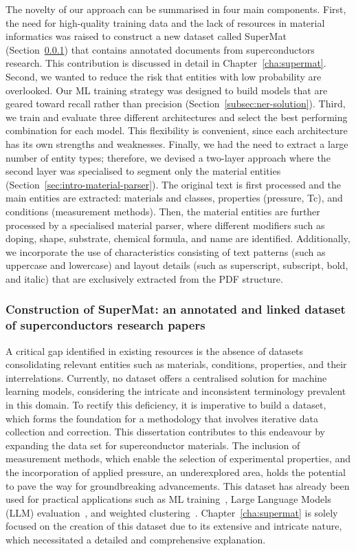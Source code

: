 The novelty of our approach can be summarised in four main components. 
First, the need for high-quality training data and the lack of resources in material informatics was raised to construct a new dataset called SuperMat (Section~\ref{sec:intro-supermat}) that contains annotated documents from superconductors research. This contribution is discussed in detail in Chapter~\ref{cha:supermat}.
Second, we wanted to reduce the risk that entities with low probability are overlooked. Our ML training strategy was designed to build models that are geared toward recall rather than precision (Section~\ref{subsec:ner-solution}).
Third, we train and evaluate three different architectures and select the best performing combination for each model. This flexibility is convenient, since each architecture has its own strengths and weaknesses.  
Finally, we had the need to extract a large number of entity types; therefore, we devised a two-layer approach where the second layer was specialised to segment only the material entities (Section~\ref{sec:intro-material-parser}).  
The original text is first processed and the main entities are extracted: materials and classes, properties (pressure, Tc), and conditions (measurement methods). 
Then, the material entities are further processed by a specialised material parser, where different modifiers such as doping, shape, substrate, chemical formula, and name are identified. 
Additionally, we incorporate the use of characteristics consisting of text patterns (such as uppercase and lowercase) and layout details (such as superscript, subscript, bold, and italic) that are exclusively extracted from the PDF structure.

\subsubsection{Construction of SuperMat: an annotated and linked dataset of superconductors research papers}
\label{sec:intro-supermat}
A critical gap identified in existing resources is the absence of datasets consolidating relevant entities such as materials, conditions, properties, and their interrelations. 
Currently, no dataset offers a centralised solution for machine learning models, considering the intricate and inconsistent terminology prevalent in this domain. 
To rectify this deficiency, it is imperative to build a dataset, which forms the foundation for a methodology that involves iterative data collection and correction. This dissertation contributes to this endeavour by expanding the data set for superconductor materials. 
The inclusion of measurement methods, which enable the selection of experimental properties, and the incorporation of applied pressure, an underexplored area, holds the potential to pave the way for groundbreaking advancements.
This dataset has already been used for practical applications such as ML training~\cite{foppiano2023automatic}, Large Language Models (LLM) evaluation~\cite{foppiano2024mining}, and weighted clustering~\cite{dieb2022superconductor}. 
Chapter~\ref{cha:supermat} is solely focused on the creation of this dataset due to its extensive and intricate nature, which necessitated a detailed and comprehensive explanation.

